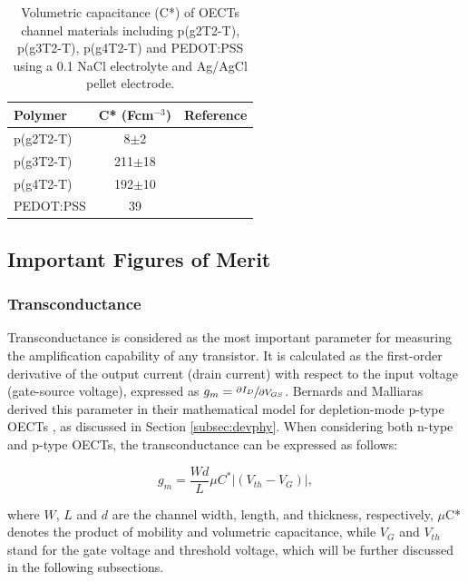 \begin{table}[h]
	\centering
	\caption[Volumetric capacitance (C*) of various OECTs channel materials]{Volumetric capacitance (C*) of OECTs channel materials including p(g2T2-T), p(g3T2-T), p(g4T2-T) and PEDOT:PSS using a 0.1 NaCl electrolyte and Ag/AgCl pellet electrode.}
	\begin{tabular}{l c c} \hline
		Polymer	&  C* (Fcm$^{-3}$) & Reference \\ \hline
		p(g2T2-T) & 8$\pm$2 & \cite{moserEthyleneGlycolBasedSide2020}\\
		p(g3T2-T) & 211$\pm$18 & \cite{moserEthyleneGlycolBasedSide2020}\\
		p(g4T2-T) & 192$\pm$10 & \cite{moserEthyleneGlycolBasedSide2020}\\  
		PEDOT:PSS & 39 & \cite{inalBenchmarkingOrganicMixed2017}\\\hline
	\end{tabular}
	\label{tab:perf}
\end{table}


\subsection{Important Figures of Merit} \label{OECT:fom}

\subsubsection{Transconductance}
Transconductance is considered as the most important parameter for measuring the amplification capability of any transistor. It is calculated as the first-order derivative of the output current (drain current) with respect to the input voltage (gate-source voltage), expressed as $g_{m} = \sfrac{\partial I_{D}}{\partial V_{GS}}$. Bernards and Malliaras derived this parameter in their mathematical model for depletion-mode p-type OECTs \cite{bernardsSteadyStateTransientBehavior2007}, as discussed in Section \ref{subsec:devphy}. When considering both n-type and p-type OECTs, the transconductance can be expressed as follows: %

\begin{equation}\label{eq:gm}
	g_{m} = \frac{Wd}{L} \mu C^{*} |(V_{th} - V_{G})|,
\end{equation}

where $W$, $L$ and $d$ are the channel width, length, and thickness, respectively, $\mu$C* denotes the product of mobility and volumetric capacitance, while $V_{G}$ and $V_{th}$ stand for the gate voltage and threshold voltage, which will be further discussed in the following subsections.

